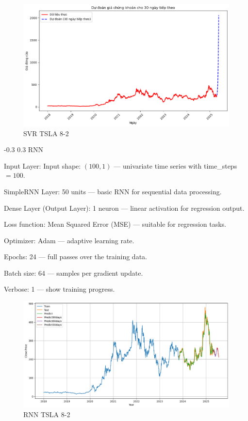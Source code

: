 \documentclass[twocolumn]{llncs}
\makeatletter
\renewcommand{\subsection}{\@startsection{subsection}{2}{\z@}%
  {-0.3\baselineskip}  %
  {0.3\baselineskip}   %
  {\normalfont\normalsize\bfseries}}
\makeatother
\begin{document}
\begin{figure}[H]
    \centering
    \includegraphics[width=1\linewidth]{SVR.png}
    \caption{SVR TSLA 8-2 }
    \label{fig:boxplot}
\end{figure}

\subsection{RNN}

Input Layer: Input shape: $(100, 1)$ — univariate time series with time\_steps $= 100$.

\noindent SimpleRNN Layer: 50 units — basic RNN for sequential data processing.

\noindent Dense Layer (Output Layer): 1 neuron — linear activation for regression output.

\noindent Loss function: Mean Squared Error (MSE) — suitable for regression tasks.

\noindent Optimizer: Adam — adaptive learning rate.

\noindent Epochs: 24 — full passes over the training data.

\noindent Batch size: 64 — samples per gradient update.

\noindent Verbose: 1 — show training progress.

\begin{figure}[H]
    \centering
    \includegraphics[width=1\linewidth]{RNN.png}
    \caption{RNN TSLA 8-2 }
    \label{fig:boxplot}
\end{figure}
\end{document}
